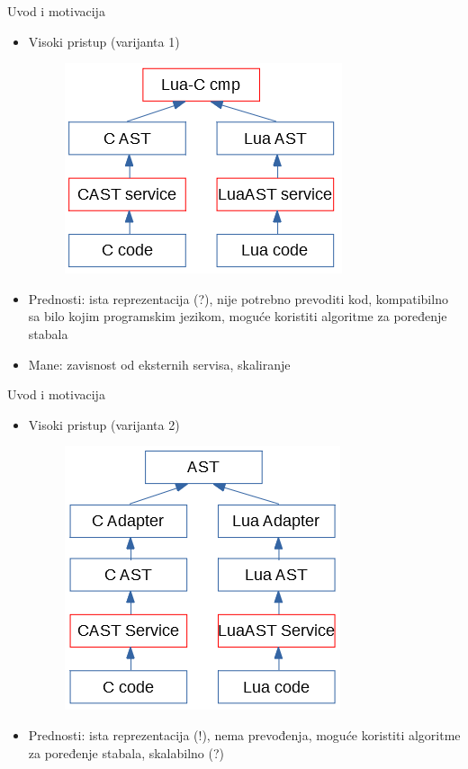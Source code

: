 \documentclass{beamer}
\begin{document}
\begin{frame}{Uvod i motivacija}
    \begin{itemize}
        \item Visoki pristup (varijanta 1)
        \begin{figure}[h!]
            \centering
            \includegraphics[scale=0.8]{images/approach_2.PNG}
        \end{figure}
        \item Prednosti: ista reprezentacija (?), nije potrebno prevoditi kod, kompatibilno sa bilo kojim programskim jezikom, mogu\'c{}e koristiti algoritme za poređenje stabala
        \item Mane: zavisnost od eksternih servisa, skaliranje
    \end{itemize}
\end{frame}

\begin{frame}{Uvod i motivacija}
    \begin{itemize}
        \item Visoki pristup (varijanta 2)
        \begin{figure}[h!]
            \centering
            \includegraphics[scale=0.8]{images/approach_3.PNG}
        \end{figure}
        \item Prednosti: ista reprezentacija (!), nema prevođenja, mogu\'c{}e koristiti algoritme za poređenje stabala, skalabilno (?)
    \end{itemize}
\end{frame}
\end{document}
